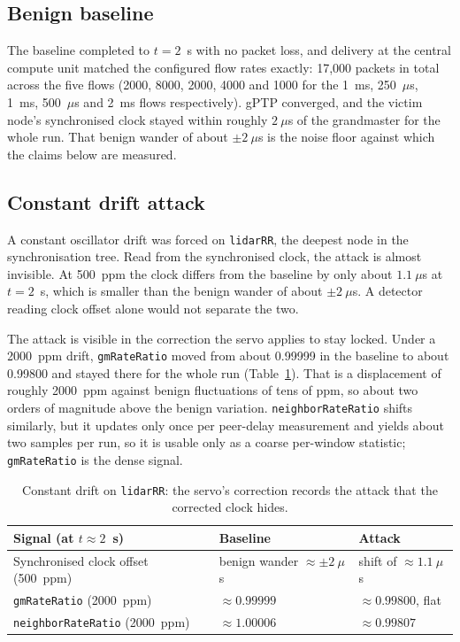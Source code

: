 \subsection{Benign baseline}

The baseline completed to $t=2$~s with no packet loss, and delivery at the central
compute unit matched the configured flow rates exactly: 17{,}000 packets in total across
the five flows (2000, 8000, 2000, 4000 and 1000 for the 1~ms, 250~$\mu$s, 1~ms, 500~$\mu$s
and 2~ms flows respectively). gPTP converged, and the victim node's synchronised clock
stayed within roughly $2~\mu$s of the grandmaster for the whole run. That benign
wander of about $\pm 2~\mu$s is the noise floor against which the claims below are
measured.

\subsection{Constant drift attack}
\label{sec:ring-drift}

A constant oscillator drift was forced on \texttt{lidarRR}, the deepest node in the
synchronisation tree. Read from the synchronised clock, the attack is almost
invisible. At 500~ppm the clock differs from the baseline by only about $1.1~\mu$s at
$t=2$~s, which is smaller than the benign wander of about $\pm 2~\mu$s. A detector
reading clock offset alone would not separate the two.

The attack is visible in the correction the servo applies to stay locked. Under a
2000~ppm drift, \texttt{gmRateRatio} moved from about 0.99999 in the baseline to about
0.99800 and stayed there for the whole run (Table~\ref{tab:ring-drift}). That is a
displacement of roughly 2000~ppm against benign fluctuations of tens of ppm, so about
two orders of magnitude above the benign variation. \texttt{neighborRateRatio} shifts
similarly, but it updates only once per peer-delay measurement and yields about two
samples per run, so it is usable only as a coarse per-window statistic;
\texttt{gmRateRatio} is the dense signal.

\begin{table}[htbp]
\centering
\caption{Constant drift on \texttt{lidarRR}: the servo's correction records the attack that the corrected clock hides.}
\label{tab:ring-drift}
\vspace{0.8em}
\small\setlength{\tabcolsep}{4pt}
\begin{tabular}{>{\raggedright\arraybackslash}p{} >{\raggedright\arraybackslash}p{} >{\raggedright\arraybackslash}p{}}
\toprule
\textbf{Signal (at $t\approx 2$~s)} & \textbf{Baseline} & \textbf{Attack} \\
\midrule
Synchronised clock offset (500~ppm) & benign wander $\approx\pm 2~\mu$s & shift of $\approx 1.1~\mu$s \\
\texttt{gmRateRatio} (2000~ppm) & $\approx 0.99999$ & $\approx 0.99800$, flat \\
\texttt{neighborRateRatio} (2000~ppm) & $\approx 1.00006$ & $\approx 0.99807$ \\
\bottomrule
\end{tabular}
\end{table}

